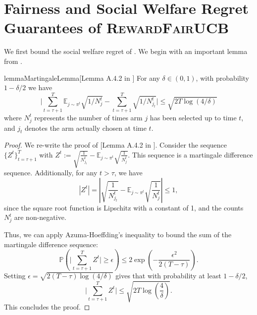 

\section{Fairness and Social Welfare Regret Guarantees of \textsc{RewardFairUCB}}

We first bound the social welfare regret of \ouralgo . We begin with an important lemma from \cite{wang2021fairness}.   
  \begin{restatable}{lemma}{MartingaleLemma}[Lemma A.4.2 in \cite{wang2021fairness}]\label{lemma:wang21}
For any $\delta \in (0,1)$, with probability $1 - \delta/2$ we have 
\begin{equation}
    \Big |\sum_{t=\tau+1}^T \mathbb{E}_{j \sim \pi^t} \sqrt{1/N_j^t} - \sum_{t=\tau+1}^T \sqrt{1/N_{j_t}^{t}} \Big | \leq \sqrt{2T\log(4/\delta)}
\end{equation}
where $N_j^t$ represents the number of times arm $j$ has been selected up to time $t$, and $j_t$ denotes the arm actually chosen at time $t$.
\end{restatable}
\begin{proof} We re-write the proof of [Lemma A.4.2 in \cite{wang2021fairness}].
Consider the sequence $\{Z^t\}_{t=\tau+1}^T$ with 
$
    Z^t := \sqrt{\frac{1}{N_{j_t}^t}} - \mathbb{E}_{j \sim \pi^t} \sqrt{\frac{1}{N_j^t}}
$. This sequence is a martingale difference sequence. Additionally, for any $t > \tau$, we have
\[
    |Z^t| = \left|\sqrt{\frac{1}{N_{j_t}^t}} - \mathbb{E}_{j \sim \pi^t} \sqrt{\frac{1}{N_j^t}}\right| \leq 1,
\]
since the square root function is Lipschitz with a constant of 1, and the counts $N_j^t$ are non-negative.

Thus, we can apply Azuma-Hoeffding's inequality to bound the sum of the martingale difference sequence:
\[
    \mathbb{P} \left( \Bigg| \sum_{t=\tau+1}^T Z^t \Bigg| \geq \epsilon \right) \leq 2 \exp\left( -\frac{\epsilon^2}{2(T-\tau)} \right).
\]
Setting $\epsilon = \sqrt{2(T-\tau) \log(4/\delta)}$ gives that with probability at least $1 - \delta/2$,
\[
    \Bigg| \sum_{t=\tau+1}^T Z^t \Bigg| \leq \sqrt{2T \log\left(\frac{4}{\delta}\right)}.
\]
This concludes the proof.
\end{proof}


